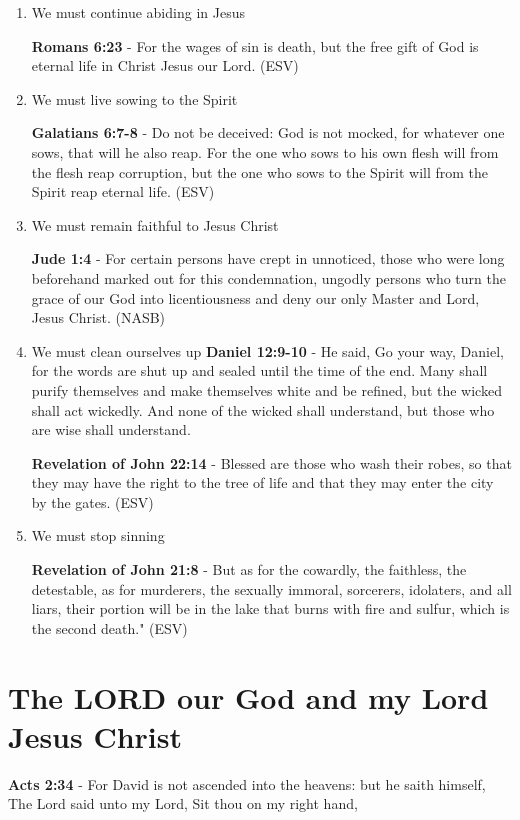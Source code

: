 \documentclass[11pt]{article}
\begin{document}
\begin{enumerate}
\item We must continue abiding in Jesus
\label{sec:org45294da}

\textbf{Romans 6:23} - For the wages of sin is death, but the free gift of God is eternal life in Christ Jesus our Lord. (ESV)

\item We must live sowing to the Spirit
\label{sec:org608662b}

\textbf{Galatians 6:7-8} - Do not be deceived: God is not mocked, for whatever one sows, that will he also reap. For the one who sows to his own flesh will from the flesh reap corruption, but the one who sows to the Spirit will from the Spirit reap eternal life. (ESV)

\item We must remain faithful to Jesus Christ
\label{sec:org6cb0197}

\textbf{Jude 1:4} - For certain persons have crept in unnoticed, those who were long beforehand marked out for this condemnation, ungodly persons who turn the grace of our God into licentiousness and deny our only Master and Lord, Jesus Christ. (NASB)

\item We must clean ourselves up
\label{sec:org31b24bc}
\textbf{Daniel 12:9-10} - He said, Go your way, Daniel, for the words are shut up and sealed until the time of the end.  Many shall purify themselves and make themselves white and be refined, but the wicked shall act wickedly. And none of the wicked shall understand, but those who are wise shall understand.

\textbf{Revelation of John 22:14} - Blessed are those who wash their robes, so that they may have the right to the tree of life and that they may enter the city by the gates. (ESV)

\item We must stop sinning
\label{sec:orgc744d3e}

\textbf{Revelation of John 21:8} - But as for the cowardly, the faithless, the detestable, as for murderers, the sexually immoral, sorcerers, idolaters, and all liars, their portion will be in the lake that burns with fire and sulfur, which is the second death." (ESV)
\end{enumerate}

\section{The LORD our God and my Lord Jesus Christ}
\label{sec:org1484c3d}
\textbf{Acts 2:34} - For David is not ascended into the heavens: but he saith himself, The Lord said unto my Lord, Sit thou on my right hand,
\end{document}
